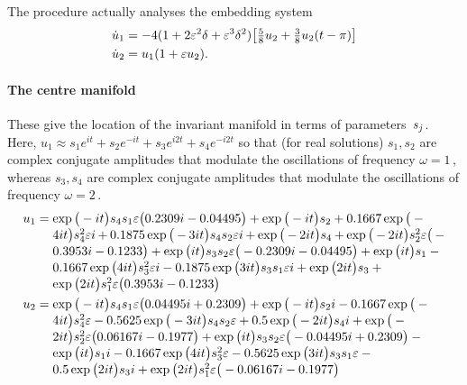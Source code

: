 The procedure actually analyses the embedding system
\begin{align*}&
\dot u_{1}=-4(1+2\varepsilon^2\delta+\varepsilon^3\delta^2)\big[\tfrac58u_2+\tfrac38u_2(t-\pi)\big]
\\&
\dot u_{2}= u_1(1+ \varepsilon u_2).
\end{align*}



\paragraph{The centre manifold} 
These give the location of the invariant manifold in terms
of parameters~\(s\sb j\). Here, \(u_1\approx
s_1e^{it}+s_2e^{-it}+s_3e^{i2t}+s_4e^{-i2t}\) so that (for
real solutions) \(s_1,s_2\) are complex conjugate amplitudes
that modulate the oscillations of frequency \(\omega=1\)\,,
whereas \(s_3,s_4\) are complex conjugate amplitudes that
modulate the oscillations of frequency \(\omega=2\)\,.
\begin{align*}&
u_{1}=\ParMath{\exp \big(-i t\big) s_{4} s_{1} \eps \big(0.2309 i-0.04495
\big)+\exp \big(-i t\big) s_{2}+0.1667 \exp \big(-4 i t\big) s_{4}^{2}
 \eps i+0.1875 \exp \big(-3 i t\big) s_{4} s_{2} \eps i+\exp \big(-2 i t
\big) s_{4}+\exp \big(-2 i t\big) s_{2}^{2} \eps \big(-0.3953 i-
0.1233\big)+\exp \big(i t\big) s_{3} s_{2} \eps \big(-0.2309 i-
0.04495\big)+\exp \big(i t\big) s_{1}-0.1667 \exp \big(4 i t\big) s_
{3}^{2} \eps i-0.1875 \exp \big(3 i t\big) s_{3} s_{1} \eps i+\exp \big(
2 i t\big) s_{3}+\exp \big(2 i t\big) s_{1}^{2} \eps \big(0.3953 i-
0.1233\big)}
\\&
u_{2}=\ParMath{\exp \big(-i t\big) s_{4} s_{1} \eps \big(0.04495 i+0.2309
\big)+\exp \big(-i t\big) s_{2} i-0.1667 \exp \big(-4 i t\big) s_{4}^{
2} \eps-0.5625 \exp \big(-3 i t\big) s_{4} s_{2} \eps+0.5 \exp \big(-2 i
 t\big) s_{4} i+\exp \big(-2 i t\big) s_{2}^{2} \eps \big(0.06167 i-
0.1977\big)+\exp \big(i t\big) s_{3} s_{2} \eps \big(-0.04495 i+
0.2309\big)-\exp \big(i t\big) s_{1} i-0.1667 \exp \big(4 i t\big) s
_{3}^{2} \eps-0.5625 \exp \big(3 i t\big) s_{3} s_{1} \eps-0.5 \exp 
\big(2 i t\big) s_{3} i+\exp \big(2 i t\big) s_{1}^{2} \eps \big(-
0.06167 i-0.1977\big)}
\end{align*}

 
